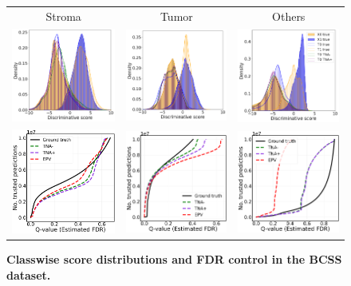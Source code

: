 \documentclass{article}
\begin{document}
\begin{figure}[h!]
	\centering	
	\begin{tabular}{ccc}
		Stroma & Tumor & Others \\
		\includegraphics[width=0.225\linewidth, height=0.225\linewidth]{img/bcss_0_neg_score_dist.png} &
		\includegraphics[width=0.225\linewidth, height=0.225\linewidth]{img/bcss_1_neg_score_dist.png} & 
		\includegraphics[width=0.225\linewidth, height=0.225\linewidth]{img/bcss_2_neg_score_dist.png} \\
		\includegraphics[width=0.225\linewidth, height=0.225\linewidth]{img/cnn_0th_bcss_class_fdr_control.png} &
		\includegraphics[width=0.225\linewidth, height=0.225\linewidth]{img/cnn_1st_bcss_class_fdr_control.png} & 
		\includegraphics[width=0.225\linewidth, height=0.225\linewidth]{img/cnn_2nd_bcss_class_fdr_control.png} \\
	\end{tabular}
	\caption{{\bf Classwise score distributions and FDR control in the BCSS dataset.}}
	\label{fig:BCSS-classwise}
\end{figure} 
\end{document}
